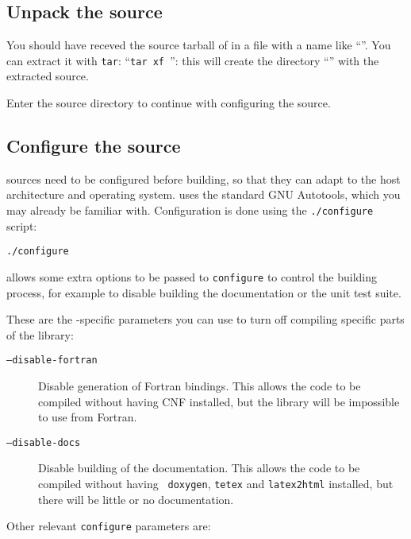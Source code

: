 \subsection{Unpack the source}

You should have receved the source tarball of \dballe{} in a file with a name
like ``\tarball{}''.  You can extract it with {\tt tar}: ``{\tt tar xf
\tarball{}}'': this will create the directory ``\sourcedir{}'' with the
extracted source.

Enter the source directory to continue with configuring the source.


\subsection{Configure the source}

\dballe{} sources need to be configured before building, so that they can adapt
to the host architecture and operating system.  \dballe{} uses the standard GNU
Autotools, which you may already be familiar with.  Configuration is done using
the {\tt ./configure} script:

\begin{verbatim}
./configure
\end{verbatim}

\dballe{} allows some extra options to be passed to {\tt configure} to control
the building process, for example to disable building the documentation or the
unit test suite.

These are the \dballe{}-specific parameters you can use to turn off compiling
specific parts of the library:

\begin{description}
\item[\tt --disable-fortran] Disable generation of Fortran bindings.  This allows
			   the code to be compiled without having CNF
			   installed, but the library will be impossible to use
			   from Fortran.
\item[\tt --disable-docs] Disable building of the documentation.  This allows
			   the code to be compiled without having {\tt
			   doxygen}, {\tt tetex} and {\tt latex2html}
			   installed, but there will be little or no
			   documentation.
\end{description}

Other relevant {\tt configure} parameters are:

